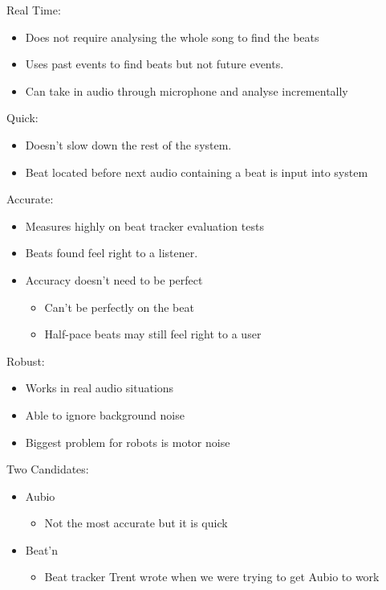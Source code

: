 \documentclass{beamer}
\begin{document}
	\begin{frame}
		Real Time:
		\begin{itemize}
			\item Does not require analysing the whole song to find the beats
			\item Uses past events to find beats but not future events.
			\item Can take in audio through microphone and analyse incrementally
		\end{itemize}		
	\end{frame}
	\begin{frame}
		Quick:
		\begin{itemize}
			\item Doesn't slow down the rest of the system.
			\item Beat located before next audio containing a beat is input into system
		\end{itemize}		
	\end{frame}
	\begin{frame}
		Accurate:
		\begin{itemize}
			\item Measures highly on beat tracker evaluation tests
			\item Beats found feel right to a listener.
			\item Accuracy doesn't need to be perfect
			\begin{itemize}
				\item Can't be perfectly on the beat
				\item Half-pace beats may still feel right to a user
			\end{itemize}	
		\end{itemize}		
	\end{frame}
	\begin{frame}
		Robust:
		\begin{itemize}
			\item Works in real audio situations
			\item Able to ignore background noise
			\item Biggest problem for robots is motor noise
		\end{itemize}		
	\end{frame}
	\begin{frame}
		Two Candidates:
		\begin{itemize}
			\item Aubio
				\begin{itemize}
					\item Not the most accurate but it is quick
				\end{itemize}
			\item Beat'n
				\begin{itemize}
					\item Beat tracker Trent wrote when we were trying to get Aubio to work
				\end{itemize}
		\end{itemize}		
	\end{frame}
\end{document}
